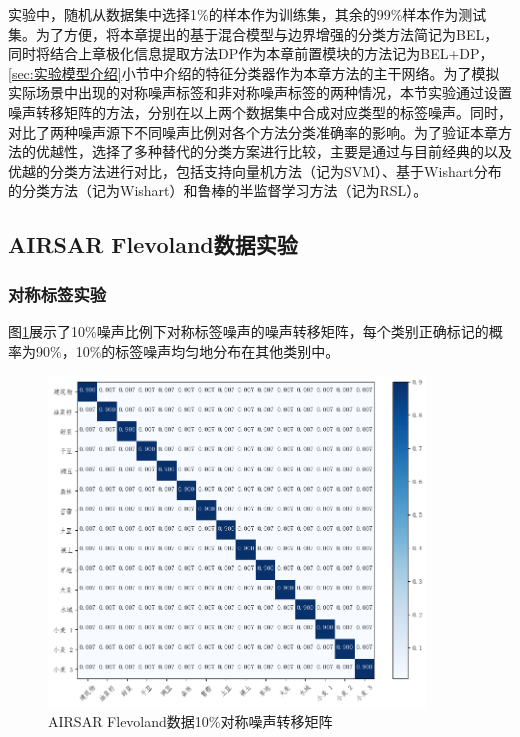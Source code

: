 实验中，随机从数据集中选择1\%的样本作为训练集，其余的99\%样本作为测试集。为了方便，将本章提出的基于混合模型与边界增强的分类方法简记为BEL，同时将结合上章极化信息提取方法DP作为本章前置模块的方法记为BEL+DP，\ref{sec:实验模型介绍}小节中介绍的特征分类器作为本章方法的主干网络。为了模拟实际场景中出现的对称噪声标签和非对称噪声标签的两种情况，本节实验通过设置噪声转移矩阵的方法，分别在以上两个数据集中合成对应类型的标签噪声。同时，对比了两种噪声源下不同噪声比例对各个方法分类准确率的影响。为了验证本章方法的优越性，选择了多种替代的分类方案进行比较，主要是通过与目前经典的以及优越的分类方法进行对比，包括支持向量机方法（记为SVM）、基于Wishart分布的分类方法（记为Wishart）和鲁棒的半监督学习方法（记为RSL）。

\subsection{AIRSAR Flevoland数据实验}
\subsubsection{对称标签实验}
图\ref{fig:fle_noise_uniform}展示了10\%噪声比例下对称标签噪声的噪声转移矩阵，每个类别正确标记的概率为90\%，10\%的标签噪声均匀地分布在其他类别中。
\begin{figure}[h]
    \centering
    \includegraphics[width=10.04cm]{pic/chapter4/fle/noise_uniform.png}
    \caption{AIRSAR Flevoland数据10\%对称噪声转移矩阵}
    \label{fig:fle_noise_uniform}
\end{figure}

